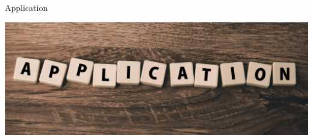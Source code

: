 \documentclass{beamer}
\begin{document}
\begin{frame}{Application}

\centering
    \includegraphics[width=\textwidth, height=\textheight, keepaspectratio]{image3/application.jpg}


    
\end{frame}
\end{document}

